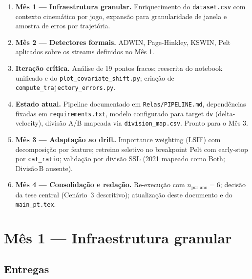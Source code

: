 \documentclass[11pt,a4paper]{article}
\begin{document}
\begin{enumerate}[leftmargin=2em,itemsep=2pt]
    \item \textbf{M\^es 1 --- Infraestrutura granular.} Enriquecimento do
          \texttt{dataset.csv} com contexto cinem\'atico por jogo, expans\~ao
          para granularidade de janela e amostra de erros por trajet\'oria.
    \item \textbf{M\^es 2 --- Detectores formais.} ADWIN, Page-Hinkley,
          KSWIN, Pelt aplicados sobre os streams definidos no M\^es 1.
    \item \textbf{Itera\c{c}\~ao cr\'itica.} An\'alise de 19 pontos
          fracos; reescrita do notebook unificado e do
          \texttt{plot\_covariate\_shift.py}; cria\c{c}\~ao de
          \texttt{compute\_trajectory\_errors.py}.
    \item \textbf{Estado atual.} Pipeline documentado em
          \texttt{Relas/PIPELINE.md}, dependências fixadas em
          \texttt{requirements.txt}, modelo configurado para target
          \texttt{dv} (delta-velocity), divis\~ao A/B mapeada via
          \texttt{division\_map.csv}. Pronto para o M\^es 3.
    \item \textbf{M\^es 3 --- Adapta\c{c}\~ao ao drift.} Importance
          weighting (LSIF) com decomposi\c{c}\~ao por feature;
          retreino seletivo no breakpoint Pelt com early-stop por
          \texttt{cat\_ratio}; valida\c{c}\~ao por divis\~ao SSL
          (2021 mapeado como Both; Divis\~ao\,B ausente).
    \item \textbf{M\^es 4 --- Consolida\c{c}\~ao e reda\c{c}\~ao.}
          Re-execu\c{c}\~ao com $n_{\text{por ano}}=6$; decis\~ao da
          tese central (Cen\'ario~3 descritivo); atualiza\c{c}\~ao
          deste documento e do \texttt{main\_pt.tex}.
\end{enumerate}

\section{M\^es 1 --- Infraestrutura granular}

\subsection{Entregas}
\end{document}

